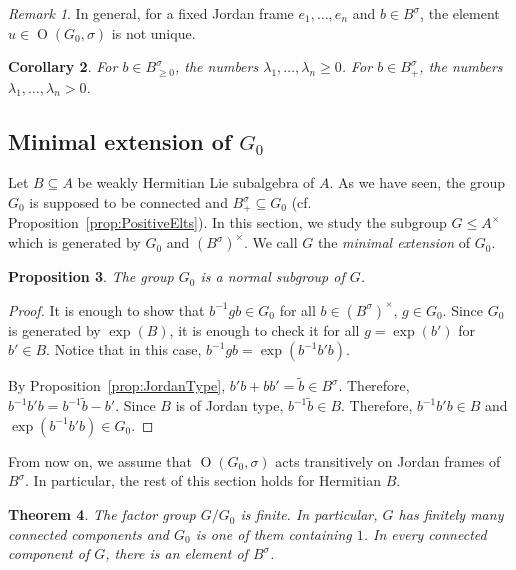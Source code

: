 \documentclass[a4paper,oneside,11pt]{amsart}
\DeclareMathOperator{\OO}{O}
\theoremstyle{plain}
\newtheorem{teo}{Theorem}[section]
\newtheorem{cor}[teo]{Corollary}
\newtheorem{prop}[teo]{Proposition}
\theoremstyle{definition}
\theoremstyle{remark}
\newtheorem{rem}[teo]{Remark}
\newcommand{\defin}{\emph}
\begin{document}
\begin{rem}
In general, for a fixed Jordan frame $e_1,\dots,e_n$ and $b\in B^{\sigma}$, the element $u\in \OO(G_0,\sigma)$ is not unique.
\end{rem}

\begin{cor}
For $b\in B^{\sigma}_{\geq 0}$, the numbers $\lambda_1,\dots,\lambda_n\geq 0$. For $b\in B^{\sigma}_+$, the numbers $\lambda_1,\dots,\lambda_n > 0$.
\end{cor}


\subsection{Minimal extension of \texorpdfstring{$G_0$}{G0}}\label{discon-ext}

Let $B\subseteq A$ be weakly Hermitian Lie subalgebra of $A$. As we have seen, the group $G_0$ is supposed to be connected and $B^{\sigma}_+\subseteq G_0$ (cf. Proposition~\ref{prop:PositiveElts}). In this section, we study the subgroup $G\leq A^\times$ which is generated by $G_0$ and $(B^{\sigma})^\times$. We call $G$ the \defin{minimal extension} of $G_0$.

\begin{prop}
The group $G_0$ is a normal subgroup of $G$.
\end{prop}

\begin{proof}
It is enough to show that $b^{-1}gb\in G_0$ for all $b\in (B^{\sigma})^\times$, $g\in G_0$. Since $G_0$ is generated by $\exp(B)$, it is enough to check it for all $g=\exp(b')$ for $b'\in B$. Notice that in this case, $b^{-1}gb=\exp(b^{-1}b'b)$.

By Proposition~\ref{prop:JordanType}, $b'b+bb'=\tilde b\in B^{\sigma}$. Therefore, $b^{-1}b'b=b^{-1}\tilde b-b'$. Since $B$ is of Jordan type, $b^{-1}\tilde b\in B$. Therefore, $b^{-1}b'b\in B$ and $\exp(b^{-1}b'b)\in G_0$.
\end{proof}

From now on, we assume that $\OO(G_0,\sigma)$ acts transitively on Jordan frames of $B^{\sigma}$. In particular, the rest of this section holds for Hermitian $B$.

\begin{teo}\label{Conn_comp_of_G}
The factor group $G/G_0$ is finite. In particular, $G$ has finitely many connected components and $G_0$ is one of them containing $1$. In every connected component of $G$, there is an element of $B^{\sigma}$.
\end{teo}
\end{document}
